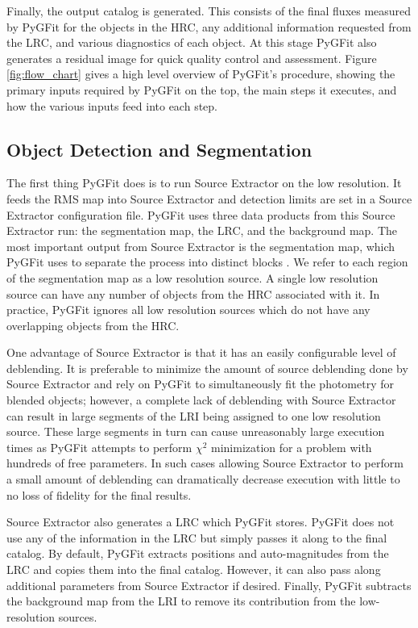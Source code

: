 \documentclass[preprint]{aastex}
\newcommand{\pygfit}{PyGFit}
\newcommand{\extractor}{Source Extractor}
\begin{document}
Finally, the output catalog is generated.  This consists of the final fluxes measured by \pygfit{} for the objects in the HRC, any additional information requested from the LRC, and various diagnostics of each object.  At this stage \pygfit{} also generates a residual image for quick quality control and assessment.  Figure \ref{fig:flow_chart} gives a high level overview of \pygfit{}'s procedure, showing the primary inputs required by \pygfit{} on the top, the main steps it executes, and how the various inputs feed into each step.

\subsection{Object Detection and Segmentation}\label{sec:segmentation}

The first thing \pygfit{} does is to run \extractor{} on the low resolution.  It feeds the RMS map into \extractor{} and detection limits are set in a \extractor{} configuration file.  \pygfit{} uses three data products from this \extractor{} run: the segmentation map, the LRC, and the background map.  The most important output from \extractor{} is the segmentation map, which \pygfit{} uses to separate the process into distinct blocks .  We refer to each region of the segmentation map as a low resolution source.  A single low resolution source can have any number of objects from the HRC associated with it.  In practice, \pygfit{} ignores all low resolution sources which do not have any overlapping objects from the HRC.

One advantage of \extractor{} is that it has an easily configurable level of deblending.  It is preferable to minimize the amount of source deblending done by \extractor{} and rely on \pygfit{} to simultaneously fit the photometry for blended objects; %
however, 
a complete lack of deblending with \extractor{} can result in large segments of the LRI being assigned to one low resolution source.  These large segments in turn can cause unreasonably large execution times as \pygfit{} attempts to perform $\chi^2$ minimization for a problem with hundreds of free parameters.  In such cases allowing \extractor{} to perform a small amount of deblending can dramatically decrease execution with little to no loss of fidelity for the final results.

\extractor{} also generates a LRC which \pygfit{} stores.  \pygfit{} does not use any of the information in the LRC but simply passes it along to the final catalog.  By default, \pygfit{} extracts positions and auto-magnitudes from the LRC and copies them into the final catalog.  However, it can also pass along additional parameters from \extractor{} if desired.
Finally, \pygfit{} subtracts the background map from the LRI to remove its contribution from the low-resolution sources.
\end{document}
